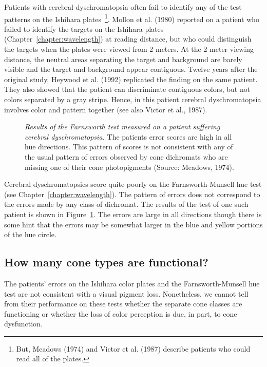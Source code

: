 Patients with cerebral dyschromatopsia often fail to identify any of
the test patterns on the Ishihara plates~\footnote{But, Meadows (1974)
and Victor et al. (1987) describe patients who could read all of the
plates.}.  Mollon et al. (1980) reported on a patient who failed to
identify the targets on the Ishihara plates
(Chapter~\ref{chapter:wavelength}) at reading distance, but who could
distinguish the targets when the plates were viewed from 2 meters.  At
the 2 meter viewing distance, the neutral areas separating the target
and background are barely visible and the target and background appear
contiguous.  Twelve years after the original study, Heywood et
al. (1992) replicated the finding on the same patient.  They also
showed that the patient can discriminate contiguous colors, but not
colors separated by a gray stripe.  Hence, in this patient cerebral
dyschromatopsia involves color and pattern together (see also Victor
et al., 1987).

\begin{figure}
\centerline{
  }
\caption[Farnsworth Test in cerebral dyschromatopsia]{
{\em Results of the Farnsworth test measured on a patient suffering
cerebral dyschromatopsia.} The patients error scores are high in all
hue directions.  This pattern of scores is not consistent with any of
the usual pattern of errors observed by cone dichromats who are
missing one of their cone photopigments (Source: Meadows, 1974).  
}
\label{f8:meadows} 
\end{figure}

Cerebral dyschromatopsics score quite poorly on the Farnsworth-Munsell
hue test (see Chapter~\ref{chapter:wavelength}).  The pattern of
errors does not correspond to the errors made by any class of
dichromat.  The results of the test of one such patient
is shown in Figure~\ref{f8:meadows}.  The errors are large in all
directions though there is some hint that the errors may be somewhat
larger in the blue and yellow portions of the hue circle.

\subsection*{How many cone types are functional?  }
The patients' errors on the Ishihara color plates and the
Farnsworth-Munsell hue test are not consistent with a visual pigment
loss.  Nonetheless, we cannot tell from their performance on these
tests whether the separate cone classes are functioning or whether the
loss of color perception is due, in part, to cone dysfunction.

